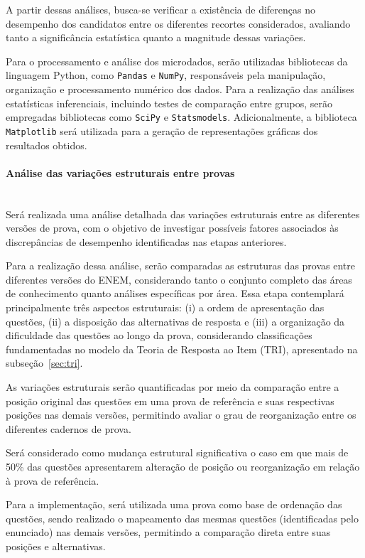 \documentclass[a4paper,10pt, twocolumn]{article}
\begin{document}
A partir dessas análises, busca-se verificar a existência de diferenças no desempenho dos candidatos entre os diferentes recortes considerados, avaliando tanto a significância estatística quanto a magnitude dessas variações.

Para o processamento e análise dos microdados, serão utilizadas bibliotecas da linguagem Python, como \texttt{Pandas} e \texttt{NumPy}, responsáveis pela manipulação, organização e processamento numérico dos dados. Para a realização das análises estatísticas inferenciais, incluindo testes de comparação entre grupos, serão empregadas bibliotecas como \texttt{SciPy} e \texttt{Statsmodels}. Adicionalmente, a biblioteca \texttt{Matplotlib} será utilizada para a geração de representações gráficas dos resultados obtidos.

\paragraph{Análise das variações estruturais entre provas}
\mbox{}\\
Será realizada uma análise detalhada das variações estruturais entre as diferentes versões de prova, com o objetivo de investigar possíveis fatores associados às discrepâncias de desempenho identificadas nas etapas anteriores.

Para a realização dessa análise, serão comparadas as estruturas das provas entre diferentes versões do ENEM, considerando tanto o conjunto completo das áreas de conhecimento quanto análises específicas por área. Essa etapa contemplará principalmente três aspectos estruturais: (i) a ordem de apresentação das questões, (ii) a disposição das alternativas de resposta e (iii) a organização da dificuldade das questões ao longo da prova, considerando classificações fundamentadas no modelo da Teoria de Resposta ao Item (TRI), apresentado na subseção~\ref{sec:tri}.

As variações estruturais serão quantificadas por meio da comparação entre a posição original das questões em uma prova de referência e suas respectivas posições nas demais versões, permitindo avaliar o grau de reorganização entre os diferentes cadernos de prova.

Será considerado como mudança estrutural significativa o caso em que mais de 50\% das questões apresentarem alteração de posição ou reorganização em relação à prova de referência.

Para a implementação, será utilizada uma prova como base de ordenação das questões, sendo realizado o mapeamento das mesmas questões (identificadas pelo enunciado) nas demais versões, permitindo a comparação direta entre suas posições e alternativas.
\end{document}
